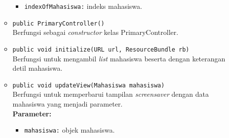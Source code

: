\begin{enumerate}
\begin{itemize}
	\begin{itemize}
		\item \texttt{indexOfMahasiswa:} indeks mahasiswa.
	\end{itemize}
    \item \texttt{public PrimaryController()}\\
    Berfungsi sebagai \textit{constructor} kelas PrimaryController.
    \item \texttt{public void initialize(URL url, ResourceBundle rb)}\\
    Berfungsi untuk mengambil \textit{list} mahasiswa beserta dengan keterangan detil mahasiswa.
    \item \texttt{public void updateView(Mahasiswa mahasiswa)}\\
    Berfungsi untuk memperbarui tampilan \textit{screensaver} dengan data mahasiswa yang menjadi parameter. \\
    \textbf{Parameter:}
	\begin{itemize}
		\item \texttt{mahasiswa:} objek mahasiswa.
	\end{itemize}
\end{itemize}

\end{enumerate}

